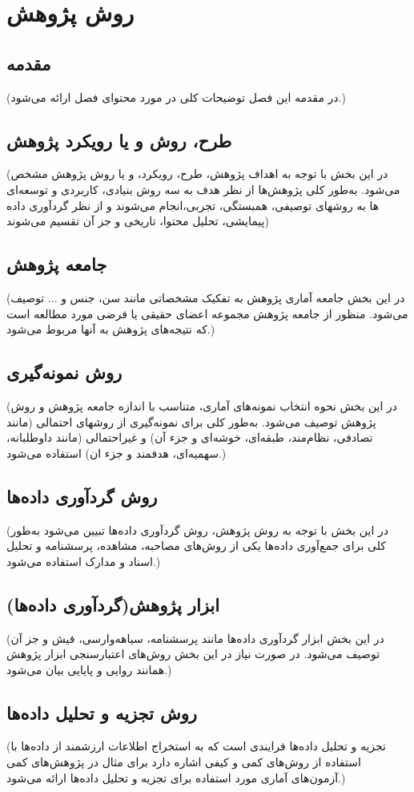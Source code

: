 \chapter{روش پژوهش}


\section{مقدمه}
(در مقدمه این فصل توضیحات کلی در مورد محتوای فصل ارائه می‌شود.)
\section{طرح، روش و یا رویکرد پژوهش}
(در این بخش با توجه به اهداف پژوهش، طرح، رویکرد، و یا روش پژوهش مشخص می‌شود. به‌طور کلی پژوهش‌ها از نظر هدف به سه روش بنیادی، کاربردی و توسعه‌ای انجام می‌شوند و از نظر گردآوری داده‎‌ها به روشهای توصیفی، همبستگی، تجربی، پیمایشی، تحلیل محتوا، تاریخی و جز آن تقسیم می‌شوند)
\section{جامعه پژوهش}
(در این بخش جامعه آماری پژوهش به تفکیک مشخصاتی مانند سن، جنس و ... توصیف می‌شود. منظور از جامعه پژوهش مجموعه  اعضای حقیقی یا فرضی مورد مطالعه است که نتیجه‌های پژوهش به آنها مربوط می‌شود.)
\section{روش نمونه‌گیری}
(در این بخش نحوه انتخاب نمونه‌های آماری، متناسب با اندازه جامعه پژوهش و روش پژوهش توصیف می‌شود. به‌طور کلی برای نمونه‌گیری از روشهای احتمالی (مانند تصادفی، نظام‌مند، طبقه‌ای، خوشه‌ای و جزء آن)  و غیراحتمالی (مانند داوطلبانه، سهمیه‌ای، هدفمند و جزء ان) استفاده می‌شود.)
\section{روش گردآوری داده‌ها}
(در این بخش با توجه به روش پژوهش، روش گردآوری داده‌ها تبیین می‌شود به‌طور کلی برای جمع‌آوری داده‌ها یکی از روش‌های مصاحبه، مشاهده، پرسشنامه و تحلیل اسناد و مدارک استفاده می‌شود.)
\section{ابزار پژوهش(گردآوری داده‌ها)}
(در این بخش ابزار گردآوری داده‌ها مانند پرسشنامه‌، سیاهه‌وارسی، فیش و جز آن توصیف می‌شود. در صورت نیاز در این بخش روش‌های اعتبارسنجی ابزار پژوهش همانند روایی و پایایی بیان می‌شود.)
\section{روش تجزیه و تحلیل داده‌ها}
(تجزیه و تحلیل داده‌ها فرایندی است که به استخراج اطلاعات ارزشمند از داده‌ها با استفاده از روش‌های کمی و کیفی اشاره دارد برای مثال در پژوهش‌های کمی آزمون‌های آماری مورد استفاده برای تجزیه و تحلیل داده‌ها ارائه می‌شود.) 
